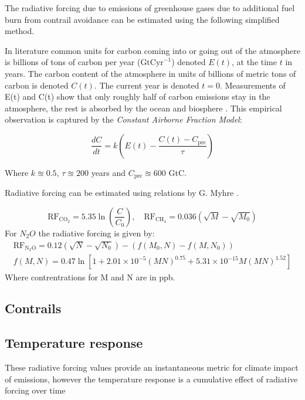 \documentclass{article}
\begin{document}
The radiative forcing due to emissions of greenhouse gases due to additional fuel burn from contrail avoidance can be estimated using the following simplified method.

In literature common units for carbon coming into or going out of the atmosphere is billions of tons of carbon per year ($\text{GtCyr}^{-1}$)
denoted $E(t)$, at the time $t$ in years. The carbon content of the atmosphere in units of billions of metric tons of carbon is denoted $C(t)$.
The current year is denoted $t=0$.
Measurements of E(t) and C(t) show that only roughly half of carbon emissions stay in the atmosphere, the rest is absorbed by the ocean and biosphere \cite{co2_modelling}.
This empirical observation is captured by the \emph{Constant Airborne Fraction Model}:

\begin{equation}
    \frac{dC}{dt} = k \left( E(t) - \frac{C(t)-C_\text{pre}}{\tau}\right)
\end{equation}

Where $k \approxeq 0.5$, $\tau \approxeq 200 $ years and $C_\text{pre} \approxeq 600$ GtC.

Radiative forcing can be estimated using relations by G. Myhre \cite{rf_greenhouse}.

\begin{equation}
    \text{RF}_{\text{CO}_2} = 5.35 \ln \left( \frac{C}{C_0} \right), \quad \text{RF}_{\text{CH}_4} = 0.036 \left( \sqrt{M}-\sqrt{M_0} \right)
\end{equation}
For $N_2O$ the radiative forcing is given by:
\begin{eqnarray}
    \text{RF}_{\text{N}_2\text{O}} = 0.12(\sqrt{N} - \sqrt{N_0}) - (f(M_0,N) - f(M,N_0)) \\
    f(M, N) = 0.47 \ln\left[1 + 2.01 \times 10^{-5} (MN)^{0.75} + 5.31 \times 10^{-15} M (MN)^{1.52}\right]
\end{eqnarray}
Where contrentrations for M and N are in ppb.

\subsection{Contrails}


\subsection{Temperature response}

These radiative forcing values provide an instantaneous metric for climate impact of emissions, however
the temperature response is a cumulative effect of radiative forcing over time
\end{document}
